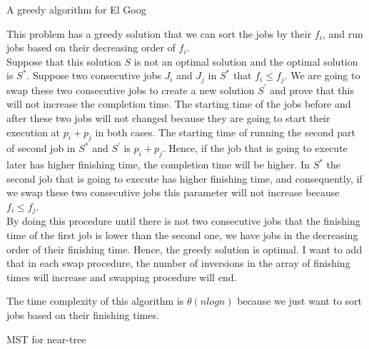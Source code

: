 \documentclass[12pt]{article}
\newenvironment{solution}[2][Solution]{\begin{trivlist}
\item[\hskip \labelsep {\bfseries #1}]}{\end{trivlist}}
\newenvironment{problem}[2][Problem]{\begin{trivlist}
\item[\hskip \labelsep {\bfseries #1}\hskip \labelsep {\bfseries #2.}]}{\end{trivlist}}
\begin{document}
\begin{problem}{2}
A greedy algorithm for El Goog
\end{problem}

\begin{solution}{}
This problem has a greedy solution that we can sort the jobs by their $f_i$,
and run jobs based on their decreasing order of $f_i$.
\\
Suppose that this solution $S$ is not an optimal solution and the optimal solution
is $S^{*}$. Suppose two consecutive jobs $J_i$ and $J_j$ in $S^{*}$ that
$f_i \leq f_j$. We are going to swap these two consecutive jobs to create a new
solution $S^\prime$ and prove that this will not increase the completion time. The
starting time of the jobs before and after these two jobs will not changed
because they are going to start their execution at $p_i + p_j$ in both cases.
The starting time of running the second part of second job in $S^*$ and $S^\prime$
is $p_i + p_j$. Hence, if the job that is going to execute later has higher 
finishing time, the completion time will be higher. In $S^*$ the second job
that is going to execute has higher finishing time, and consequently, if we
swap these two consecutive jobs this parameter will not increase because
$f_i \leq f_j$.
\\
By doing this procedure until there is not two consecutive jobs that the
finishing time of the first job is lower than the second one, we have jobs
in the decreasing order of their finishing time. Hence, the greedy solution 
is optimal. I want to add that in each swap procedure, the number of inversions
in the array of finishing times will increase and swapping procedure will end.

The time complexity of this algorithm is $\theta(nlogn)$ because we just want to sort
jobs based on their finishing times.
\end{solution}


\begin{problem}{3}
MST for near-tree
\end{problem}
\end{document}
